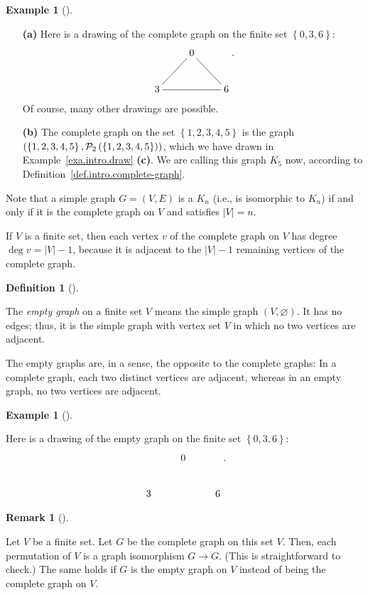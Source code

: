 \documentclass[numbers=enddot,12pt,final,onecolumn,notitlepage]{scrartcl}%
\makeatletter
\theoremstyle{definition}
\newtheorem{defi}[theo]{Definition}
\newenvironment{definition}[1][]
{\begin{defi}[#1]\begin{leftbar}}
{\end{leftbar}\end{defi}}
\newtheorem{remk}[theo]{Remark}
\newenvironment{remark}[1][]
{\begin{remk}[#1]\begin{leftbar}}
{\end{leftbar}\end{remk}}
\newtheorem{exam}[theo]{Example}
\newenvironment{example}[1][]
{\begin{exam}[#1]\begin{leftbar}}
{\end{leftbar}\end{exam}}
\newcommand{\powset}[2][]{\ifthenelse{\equal{#2}{}}{\mathcal{P}\left(#1\right)}{\mathcal{P}_{#1}\left(#2\right)}}
\newcommand{\set}[1]{\left\{ #1 \right\}}
\newcommand{\abs}[1]{\left| #1 \right|}
\newcommand{\tup}[1]{\left( #1 \right)}
\newcommand{\are}{\ar@{-}}
\makeatother
\begin{document}
\begin{example}
\begin{enumerate}

\item[\textbf{(a)}]
Here is a drawing of the complete graph on the finite set
$\set{0, 3, 6}$:
\begin{align*}
\xymatrix{
& 0 \are[ld] \are[rd] \\
3 \are[rr] & & 6
} .
\end{align*}
Of course, many other drawings are possible.

\item[\textbf{(b)}]
The complete graph on the set $\set{1, 2, 3, 4, 5}$ is the graph
$\tup{\set{1, 2, 3, 4, 5}, \powset[2]{\set{1, 2, 3, 4, 5}}}$, which
we have drawn in Example~\ref{exa.intro.draw} \textbf{(c)}.
We are calling this graph $K_5$
now, according to Definition~\ref{def.intro.complete-graph}.

\end{enumerate}
\end{example}

Note that a simple graph $G = \tup{V, E}$ is a $K_n$ (i.e., is
isomorphic to $K_n$) if and only if it is the complete graph on $V$
and satisfies $\abs{V} = n$.

If $V$ is a finite set, then each vertex $v$ of the complete graph on
$V$ has degree $\deg v = \abs{V}-1$, because it is adjacent to the
$\abs{V}-1$ remaining vertices of the complete graph.

\begin{definition} \label{def.intro.empty-graph}
The \textit{empty graph} on a finite set $V$ means
the simple graph $\tup{V, \varnothing}$. It has no edges; thus, it is
the simple graph with vertex set $V$ in which no two vertices are
adjacent.
\end{definition}

The empty graphs are, in a sense, the opposite to the complete graphs:
In a complete graph, each two distinct vertices are adjacent, whereas
in an empty graph, no two vertices are adjacent.

\begin{example}
Here is a drawing of the empty graph on the finite set
$\set{0, 3, 6}$:
\begin{align*}
\xymatrix{
& 0 \\
3 & & 6
} .
\end{align*}
\end{example}


\begin{remark}
Let $V$ be a finite set. Let $G$ be the complete graph on this set
$V$. Then, each permutation of $V$ is a graph isomorphism $G \to G$.
(This is straightforward to check.) The same holds if $G$ is the
empty graph on $V$ instead of being the complete graph on $V$.
\end{remark}
\end{document}
